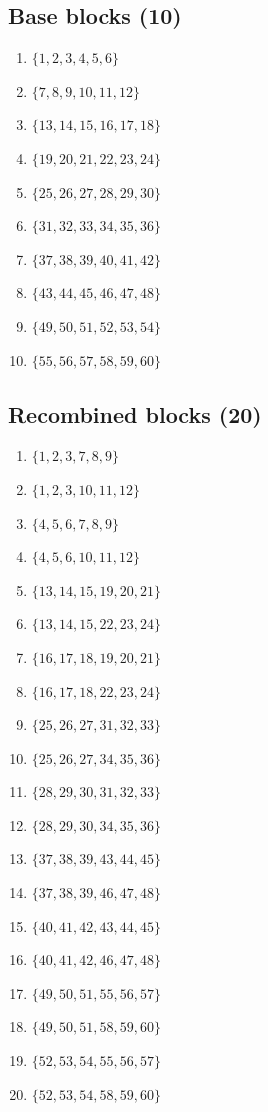 \documentclass[10pt]{article}
\begin{document}
\subsection*{Base blocks (10)}
\begin{enumerate}[label=\textbf{\arabic*.},leftmargin=*,itemsep=0.15em]
\item $\{1,2,3,4,5,6\}$
\item $\{7,8,9,10,11,12\}$
\item $\{13,14,15,16,17,18\}$
\item $\{19,20,21,22,23,24\}$
\item $\{25,26,27,28,29,30\}$
\item $\{31,32,33,34,35,36\}$
\item $\{37,38,39,40,41,42\}$
\item $\{43,44,45,46,47,48\}$
\item $\{49,50,51,52,53,54\}$
\item $\{55,56,57,58,59,60\}$
\end{enumerate}

\subsection*{Recombined blocks (20)}
\begin{enumerate}[label=\textbf{\arabic*.},leftmargin=*,itemsep=0.15em,resume]
\item $\{1,2,3,7,8,9\}$
\item $\{1,2,3,10,11,12\}$
\item $\{4,5,6,7,8,9\}$
\item $\{4,5,6,10,11,12\}$
\item $\{13,14,15,19,20,21\}$
\item $\{13,14,15,22,23,24\}$
\item $\{16,17,18,19,20,21\}$
\item $\{16,17,18,22,23,24\}$
\item $\{25,26,27,31,32,33\}$
\item $\{25,26,27,34,35,36\}$
\item $\{28,29,30,31,32,33\}$
\item $\{28,29,30,34,35,36\}$
\item $\{37,38,39,43,44,45\}$
\item $\{37,38,39,46,47,48\}$
\item $\{40,41,42,43,44,45\}$
\item $\{40,41,42,46,47,48\}$
\item $\{49,50,51,55,56,57\}$
\item $\{49,50,51,58,59,60\}$
\item $\{52,53,54,55,56,57\}$
\item $\{52,53,54,58,59,60\}$
\end{enumerate}
\end{document}
